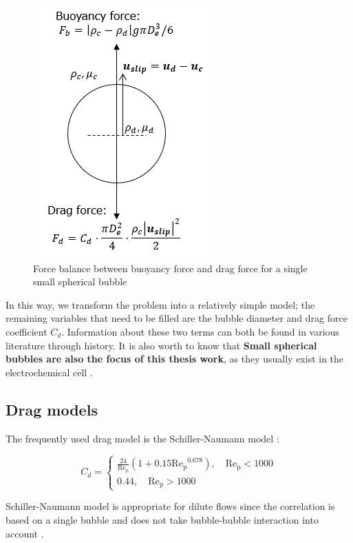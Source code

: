 \begin{figure}[H]
    \centering
    \includegraphics{force_balance.png}
    \caption{Force balance between buoyancy force and drag force for a single small spherical bubble}
    \label{force}
\end{figure}

In this way, we transform the problem into a relatively simple model; the remaining variables that need to be filled are the bubble diameter and drag force coefficient $C_d$. Information about these two terms can both be found in various literature through history. It is also worth to know that \textbf{Small spherical bubbles are also the focus of this thesis work}, as they usually exist in the electrochemical cell \cite{Energy}.

\subsection{Drag models}\label{section:dragmodel}
The frequently used drag model is the Schiller-Naumann model \cite{schwarzkopf2011multiphase}:

\begin{equation}
  C_d=\begin{cases}
               \frac{24}{\mathrm{Re_p}}(1+0.15\mathrm{Re_p}^{0.678}), \quad \mathrm{Re_p} <1000\\
               0.44, \quad \mathrm{Re_p}>1000
            \end{cases}
\end{equation}

Schiller-Naumann model is appropriate for dilute flows since the correlation is based on a single bubble and does not take bubble-bubble interaction into account \cite{COMSOL2016}.

